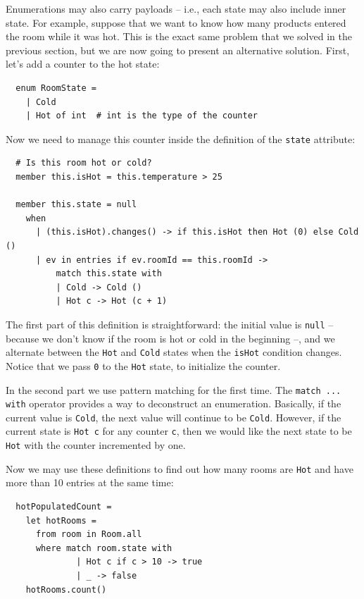 Enumerations may also carry payloads -- i.e., each state may also
include inner state. For example, suppose that we want to know how
many products entered the room while it was hot. This is the exact
same problem that we solved in the previous section, but we are now
going to present an alternative solution. First, let's add a counter
to the hot state:

\begin{lstlisting}
  enum RoomState =
    | Cold
    | Hot of int  # int is the type of the counter
\end{lstlisting}

Now we need to manage this counter inside the definition of the
\verb=state= attribute:

\begin{lstlisting}
  # Is this room hot or cold?
  member this.isHot = this.temperature > 25

  member this.state = null
    when
      | (this.isHot).changes() -> if this.isHot then Hot (0) else Cold ()
      | ev in entries if ev.roomId == this.roomId ->
          match this.state with
          | Cold -> Cold ()
          | Hot c -> Hot (c + 1)

\end{lstlisting}


The first part of this definition is straightforward: the initial
value is \verb=null= -- because we don't know if the room is hot or
cold in the beginning --, and we alternate between the \verb=Hot= and
\verb=Cold= states when the \verb=isHot= condition changes. Notice
that we pass \verb=0= to the \verb=Hot= state, to initialize the
counter.

In the second part we use pattern matching for the first time. The
\verb=match ... with= operator provides a way to deconstruct an
enumeration. Basically, if the current value is \verb=Cold=, the next
value will continue to be \verb=Cold=. However, if the current state
is \verb=Hot c= for any counter \verb=c=, then we would like the next
state to be \verb=Hot= with the counter incremented by one.

Now we may use these definitions to find out how many rooms are
\verb=Hot= and have more than 10 entries at the same time:

\begin{lstlisting}
  hotPopulatedCount =
    let hotRooms =
      from room in Room.all
      where match room.state with
              | Hot c if c > 10 -> true
              | _ -> false
    hotRooms.count()
\end{lstlisting}

